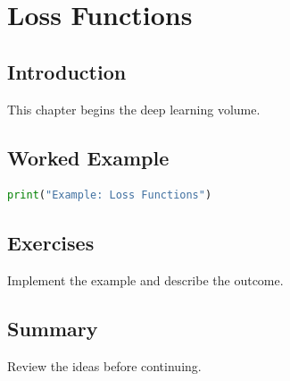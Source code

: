 \chapter{Loss Functions}
\label{chap:vol7-4}



\section{Introduction}
This chapter begins the deep learning volume.

\section{Worked Example}
\begin{lstlisting}[language=Python]
print("Example: Loss Functions")
\end{lstlisting}

\section{Exercises}
\begin{exercise}
Implement the example and describe the outcome.
\end{exercise}

\section{Summary}
Review the ideas before continuing.
